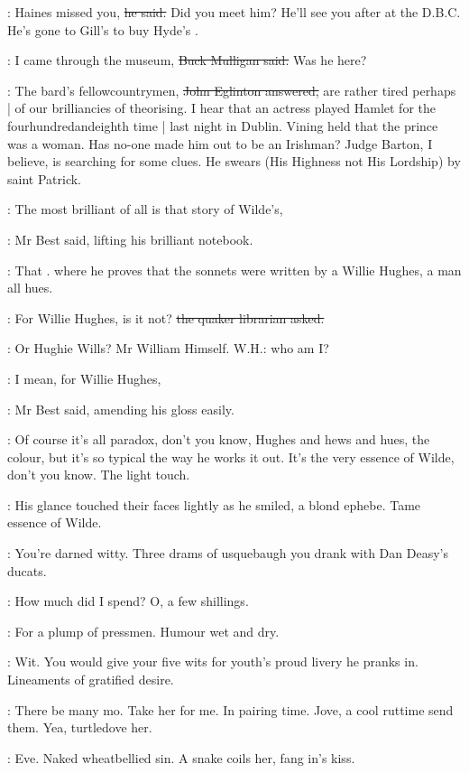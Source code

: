 \best:
Haines missed you,
\sout{he said.}
Did you meet him?
He'll see you after at the D.B.C.
He's gone to Gill's to buy Hyde's .

\mulligan:
I came through the museum,
\sout{Buck Mulligan said.}
Was he here?

\eglinton:
The bard's fellowcountrymen,
\sout{John Eglinton answered,}
are rather tired perhaps |
of our brilliancies of theorising.
I hear that an actress played Hamlet for the fourhundredandeighth time |
last night in Dublin.
Vining held that the prince was a woman.
Has no-one made him out to be an Irishman?
Judge Barton,
I believe,
is searching for some clues.
He swears
(His Highness not His Lordship)
by saint Patrick.

\best:
The most brilliant of all is that story of Wilde's,

:
Mr Best said,
lifting his brilliant notebook.

\best:
That .
where he proves that the sonnets were written by a Willie Hughes,
a man all hues.

\librarian:
For Willie Hughes,
is it not?
\sout{the quaker librarian asked.}

\StephenInt:
Or Hughie Wills?
Mr William Himself.
W.H.:
who am I?

\best:
I mean,
for Willie Hughes,

:
Mr Best said, amending his gloss easily.

\best:
Of course it's all paradox,
don't you know,
Hughes and hews and hues,
the colour,
but it's so typical the way he works it out.
It's the very essence of Wilde,
don't you know.
The light touch.

:
His glance touched their faces lightly as he smiled,
a blond ephebe.
Tame essence of Wilde.

\StephenInt:
You're darned witty.
Three drams of usquebaugh you drank with Dan Deasy's ducats.

\StephenInt:
How much did I spend?
O, a few shillings.

\StephenInt:
For a plump of pressmen.
Humour wet and dry.

\StephenInt:
Wit.
You would give your five wits for youth's proud livery he pranks in.
Lineaments of gratified desire.

\StephenInt:
There be many mo.
Take her for me.
In pairing time.
Jove, a cool ruttime send them.
Yea, turtledove her.

\StephenInt:
Eve.
Naked wheatbellied sin.
A snake coils her,
fang in's kiss.

